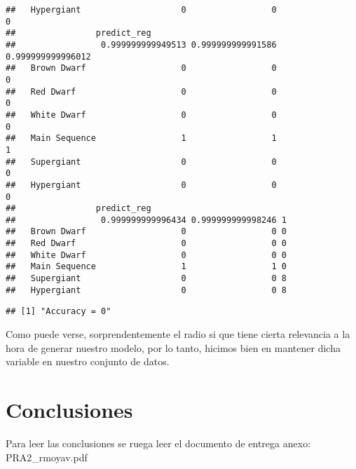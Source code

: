\documentclass[
]{article}
\newenvironment{Shaded}{\begin{snugshade}}{\end{snugshade}}
\newcommand{\DecValTok}[1]{\textcolor[rgb]{0.86,0.86,0.80}{#1}}
\newcommand{\FunctionTok}[1]{\textcolor[rgb]{0.94,0.94,0.56}{#1}}
\newcommand{\NormalTok}[1]{\textcolor[rgb]{0.80,0.80,0.80}{#1}}
\newcommand{\OtherTok}[1]{\textcolor[rgb]{0.94,0.94,0.56}{#1}}
\newcommand{\SpecialCharTok}[1]{\textcolor[rgb]{0.86,0.64,0.64}{#1}}
\newcommand{\StringTok}[1]{\textcolor[rgb]{0.80,0.58,0.58}{#1}}
\begin{document}
\begin{verbatim}
##   Hypergiant                    0                 0                 0
##                predict_reg
##                 0.999999999949513 0.999999999991586 0.999999999996012
##   Brown Dwarf                   0                 0                 0
##   Red Dwarf                     0                 0                 0
##   White Dwarf                   0                 0                 0
##   Main Sequence                 1                 1                 1
##   Supergiant                    0                 0                 0
##   Hypergiant                    0                 0                 0
##                predict_reg
##                 0.999999999996434 0.999999999998246 1
##   Brown Dwarf                   0                 0 0
##   Red Dwarf                     0                 0 0
##   White Dwarf                   0                 0 0
##   Main Sequence                 1                 1 0
##   Supergiant                    0                 0 8
##   Hypergiant                    0                 0 8
\end{verbatim}

\begin{Shaded}
\end{Shaded}

\begin{verbatim}
## [1] "Accuracy = 0"
\end{verbatim}

Como puede verse, sorprendentemente el radio si que tiene cierta
relevancia a la hora de generar nuestro modelo, por lo tanto, hicimos
bien en mantener dicha variable en nuestro conjunto de datos.

\hypertarget{conclusiones}{%
\section{Conclusiones}\label{conclusiones}}

Para leer las conclusiones se ruega leer el documento de entrega anexo:
PRA2\_rmoyav.pdf
\end{document}
